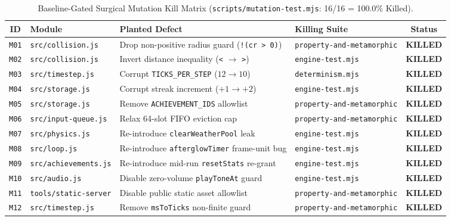 \documentclass[11pt,letterpaper]{article}
\theoremstyle{remark}
\begin{document}
\begin{table}[ht]
\centering
\caption{Baseline-Gated Surgical Mutation Kill Matrix (\texttt{scripts/mutation-test.mjs}: 16/16 = 100.0\% Killed).}
\label{tab:mutants}
\footnotesize
\setlength{\tabcolsep}{4pt}
\begin{tabular}{@{} c l >{\raggedright\arraybackslash}p{6.5cm} l c @{}}
\toprule
\textbf{ID} & \textbf{Module} & \textbf{Planted Defect} & \textbf{Killing Suite} & \textbf{Status} \\
\midrule
\texttt{M01} & \texttt{src/collision.js} & Drop non-positive radius guard (\texttt{!(cr > 0)}) & \texttt{property-and-metamorphic} & \textbf{KILLED} \\
\texttt{M02} & \texttt{src/collision.js} & Invert distance inequality (\texttt{<} $\to$ \texttt{>}) & \texttt{engine-test.mjs} & \textbf{KILLED} \\
\texttt{M03} & \texttt{src/timestep.js} & Corrupt \texttt{TICKS\_PER\_STEP} ($12 \to 10$) & \texttt{determinism.mjs} & \textbf{KILLED} \\
\texttt{M04} & \texttt{src/storage.js} & Corrupt streak increment ($+1 \to +2$) & \texttt{engine-test.mjs} & \textbf{KILLED} \\
\texttt{M05} & \texttt{src/storage.js} & Remove \texttt{ACHIEVEMENT\_IDS} allowlist & \texttt{property-and-metamorphic} & \textbf{KILLED} \\
\texttt{M06} & \texttt{src/input-queue.js} & Relax 64-slot FIFO eviction cap & \texttt{property-and-metamorphic} & \textbf{KILLED} \\
\texttt{M07} & \texttt{src/physics.js} & Re-introduce \texttt{clearWeatherPool} leak & \texttt{engine-test.mjs} & \textbf{KILLED} \\
\texttt{M08} & \texttt{src/loop.js} & Re-introduce \texttt{afterglowTimer} frame-unit bug & \texttt{engine-test.mjs} & \textbf{KILLED} \\
\texttt{M09} & \texttt{src/achievements.js} & Re-introduce mid-run \texttt{resetStats} re-grant & \texttt{engine-test.mjs} & \textbf{KILLED} \\
\texttt{M10} & \texttt{src/audio.js} & Disable zero-volume \texttt{playToneAt} guard & \texttt{engine-test.mjs} & \textbf{KILLED} \\
\texttt{M11} & \texttt{tools/static-server} & Disable public static asset allowlist & \texttt{property-and-metamorphic} & \textbf{KILLED} \\
\texttt{M12} & \texttt{src/timestep.js} & Remove \texttt{msToTicks} non-finite guard & \texttt{property-and-metamorphic} & \textbf{KILLED} \\

\end{tabular}
\end{table}
\end{document}
